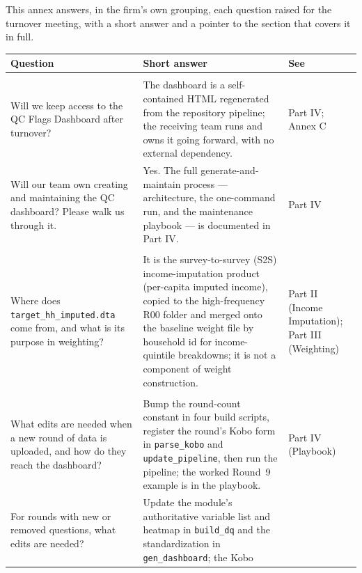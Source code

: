 

This annex answers, in the firm's own grouping, each question raised for the
turnover meeting, with a short answer and a pointer to the section that covers
it in full.

\footnotesize
\setlength{\tabcolsep}{4pt}
\begin{longtable}{>{\raggedright\arraybackslash}p{5.1cm} >{\raggedright\arraybackslash}p{7.4cm} >{\raggedright\arraybackslash}p{2.2cm}}
\toprule
\textbf{Question} & \textbf{Short answer} & \textbf{See} \\
\midrule
\endhead
\multicolumn{3}{@{}l}{\textbf{Quality Checks}} \\
Will we keep access to the QC Flags Dashboard after turnover? &
The dashboard is a self-contained HTML regenerated from the repository pipeline;
the receiving team runs and owns it going forward, with no external dependency. &
Part IV; Annex C \\[0.4em]
Will our team own creating and maintaining the QC dashboard? Please walk us
through it. &
Yes. The full generate-and-maintain process --- architecture, the one-command
run, and the maintenance playbook --- is documented in Part IV. &
Part IV \\[0.4em]
\midrule
\multicolumn{3}{@{}l}{\textbf{Data Processing --- Weighting}} \\
Where does \texttt{target\_hh\_imputed.dta} come from, and what is its purpose
in weighting? &
It is the survey-to-survey (S2S) income-imputation product (per-capita imputed
income), copied to the high-frequency R00 folder and merged onto the baseline
weight file by household id for income-quintile breakdowns; it is not a
component of weight construction. &
Part II (Income Imputation); Part III (Weighting) \\[0.4em]
\midrule
\multicolumn{3}{@{}l}{\textbf{Dashboard}} \\
What edits are needed when a new round of data is uploaded, and how do they
reach the dashboard? &
Bump the round-count constant in four build scripts, register the round's Kobo
form in \texttt{parse\_kobo} and \texttt{update\_pipeline}, then run the
pipeline; the worked Round~9 example is in the playbook. &
Part IV (Playbook) \\[0.4em]
For rounds with new or removed questions, what edits are needed? &
Update the module's authoritative variable list and heatmap in
\texttt{build\_dq} and the standardization in \texttt{gen\_dashboard}; the Kobo

\end{longtable}

